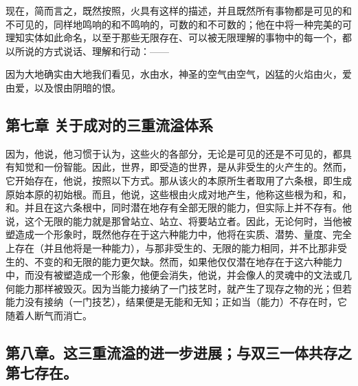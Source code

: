 现在，简而言之，既然按照，火具有这样的描述，并且既然所有事物都是可见的和不可见的，同样地鸣响的和不鸣响的，可数的和不可数的；他在中将一种完美的可理知实体如此命名，以至于那些无限存在、可以被无限理解的事物中的每一个，都以所说的方式说话、理解和行动：——\par

因为大地确实由大地我们看见，水由水，\newline{}神圣的空气由空气，凶猛的火焰由火，\newline{}爱由爱，以及恨由阴暗的恨。\par


\subsection{第七章 关于成对的三重流溢体系}

因为，他说，他习惯于认为，这些火的各部分，无论是可见的还是不可见的，都具有知觉和一份智能。因此，世界，即受造的世界，是从非受生的火产生的。然而，它开始存在，他说，按照以下方式。那从该火的本原所生者取用了六条根，即生成原始本原的初始根。而且，他说，这些根由火成对地产生，他称这些根为和，和，和。并且在这六条根中，同时潜在地存有全部无限的能力，但实际上并不存有。他说，这个无限的能力就是那曾站立、站立、将要站立者。因此，无论何时，当他被塑造成一个形象时，既然他存在于这六种能力中，他将在实质、潜势、量度、完全上存在（并且他将是一种能力），与那非受生的、无限的能力相同，并不比那非受生的、不变的和无限的能力更欠缺。然而，如果他仅仅潜在地存在于这六种能力中，而没有被塑造成一个形象，他便会消失，他说，并会像人的灵魂中的文法或几何能力那样被毁灭。因为当能力接纳了一门技艺时，就产生了现存之物的光；但若能力没有接纳（一门技艺），结果便是无能和无知；正如当（能力）不存在时，它随着人断气而消亡。\par


\subsection{第八章。这三重流溢的进一步进展；与双三一体共存之第七存在。}


